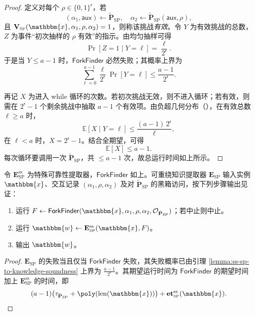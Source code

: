 \documentclass[american,singlepageview]{snargs-book-zh}
\newcommand{\Bits}{\{0,1\}}
\newcommand{\Malicious}[1]{\tilde{#1}}
\newcommand{\AuxiliaryState}{\mathsf{aux}}
\newcommand{\BlackBox}[1]{\mathcal{O}_{#1}}
\newcommand{\Expectation}{\mathbb{E}}
\newcommand{\RandomVariableX}{X}
\newcommand{\BitSize}[1]{\mathrm{len}(#1)}
\newcommand{\Instance}{\mathbbm{x}}
\newcommand{\Witness}{\mathbbm{w}}
\newcommand{\ProtoProver}{P}
\newcommand{\ProtoVerifier}{V}
\newcommand{\ProtoExtractor}{E}
\newcommand{\ProtoKnowledgeTime}{\mathbf{et}}
\newcommand{\ProtoRandomnessComplexity}{\mathsf{r}}
\newcommand{\SPSubscript}{\scriptscriptstyle\mathrm{SP}}
\newcommand{\SPFormat}[1]{\mathbf{#1}}
\newcommand{\SPVerifier}{\SPFormat{\ProtoVerifier}_{\SPSubscript}}
\newcommand{\SPExtractor}{\SPFormat{\ProtoExtractor}_{\SPSubscript}}
\newcommand{\SPMaliciousProver}{\Malicious{\SPFormat{\ProtoProver}}_{\SPSubscript}}
\newcommand{\SPCommitment}{\alpha_{1}}
\newcommand{\SPChallenge}{\rho}
\newcommand{\SPResponse}{\alpha_{2}}
\newcommand{\SPRandomnessComplexity}{\ProtoRandomnessComplexity}
\newcommand{\SPRandomnessCardinality}{2^{\ProtoRandomnessComplexity}}
\newcommand{\ProverRunningTime}[1]{\tau_{#1}}
\newcommand{\SSSuperscript}{\mathrm{ss}}
\newcommand{\SSArity}{a}
\newcommand{\SSFork}{F}
\newcommand{\SPSSExtractor}{\SPExtractor^{\SSSuperscript}}
\newcommand{\SPSSKnowledgeTime}{\ProtoKnowledgeTime_{\SPSubscript}^{\SSSuperscript}}
\newcommand{\SSForkFinder}{\mathsf{ForkFinder}}
\newcommand{\SSGoodChallengeNumber}{Y}
\newcommand{\SSFinderHasFound}{Z}
\begin{document}
\begin{proof}
定义对每个 $\SPChallenge\in\Bits^{\SPRandomnessComplexity}$，若
\[
  (\SPCommitment,\AuxiliaryState)\gets\SPMaliciousProver,\quad
  \SPResponse\gets\SPMaliciousProver(\AuxiliaryState,\SPChallenge),
\]
且 $\SPVerifier(\Instance,\SPCommitment,\SPChallenge,\SPResponse)=1$，则称该挑战\emph{有效}。令 $\SSGoodChallengeNumber$ 为有效挑战的总数，$\SSFinderHasFound$ 为事件“初次抽样的 $\SPChallenge$ 有效”的指示。由均匀抽样可得
\[
  \Pr[\SSFinderHasFound=1\mid \SSGoodChallengeNumber=\ell]
  = \frac\ell{\SPRandomnessCardinality}.
\]
于是当 $\SSGoodChallengeNumber\le\SSArity-1$ 时，$\SSForkFinder$ 必然失败；其概率上界为
\[
  \sum_{\ell=0}^{\SSArity-1}
    \frac\ell{\SPRandomnessCardinality}\Pr[\SSGoodChallengeNumber=\ell]
  \le \frac{\SSArity-1}{\SPRandomnessCardinality}.
\]

再记 $\RandomVariableX$ 为进入 while 循环的次数。若初次挑战无效，则不进入循环；若有效，则需在 $\SPRandomnessCardinality-1$ 个剩余挑战中抽取 $\SSArity-1$ 个有效项。由负超几何分布（），在有效总数 $\ell\ge\SSArity$ 时，
\[
  \Expectation[\RandomVariableX \mid \SSGoodChallengeNumber=\ell]
  \le \frac{(\SSArity-1)\,\SPRandomnessCardinality}{\ell},
\]
在 $\ell<\SSArity$ 时，$\RandomVariableX=\SPRandomnessCardinality-1$。结合全期望，可得
\[
  \Expectation[\RandomVariableX]\le \SSArity-1.
\]
每次循环要调用一次 $\SPMaliciousProver$，共 $\le\SSArity-1$ 次，故总运行时间如上所示。
\end{proof}

\begin{construction}
\label{construction:ss-extractor-for-sp}
令 $\SPSSExtractor$ 为特殊可靠性提取器，$\SSForkFinder$ 如上。可重绕知识提取器 $\SPExtractor$ 输入实例 $\Instance$、交互记录 $(\SPCommitment,\SPChallenge,\SPResponse)$ 及对 $\SPMaliciousProver$ 的黑箱访问，按下列步骤输出见证：
\begin{enumerate}[nolistsep]
  \item 运行 $\SSFork\gets\SSForkFinder(\Instance,\SPCommitment,\SPChallenge,\SPResponse,\BlackBox{\SPMaliciousProver})$；若中止则中止。
  \item 运行 $\Witness\gets\SPSSExtractor(\Instance,\SSFork)$。
  \item 输出 $\Witness$。
\end{enumerate}
\end{construction}

\begin{proof}
$\SPExtractor$ 的失败当且仅当 $\SSForkFinder$ 失败，其失败概率已由引理 \ref{lemma:ss-sp-to-knowledge-soundness} 上界为 $\frac{\SSArity-1}{\SPRandomnessCardinality}$。其期望运行时间为 $\SSForkFinder$ 的期望时间加上 $\SPSSExtractor$ 的时间，即
\[
  (\SSArity-1)\bigl(\ProverRunningTime{\SPMaliciousProver}+\poly(\BitSize{\Instance})\bigr)
  +\SPSSKnowledgeTime(\Instance).
\]
\end{proof}
\end{document}

